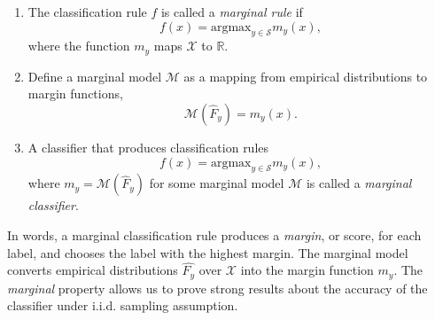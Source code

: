 \documentclass[12pt]{article}
\begin{document}
\begin{definition}
\begin{enumerate}
\item The classification rule $f$ is called a \emph{marginal rule} if 
\[
f(x) = \text{argmax}_{y \in \mathcal{S}} m_y(x),
\]
where the function $m_y$ maps $\mathcal{X}$ to $\mathbb{R}$. 
\item Define a marginal model $\mathcal{M}$ as a mapping from empirical distributions
to margin functions,
\[
\mathcal{M}(\hat{F}_y) = m_y(x).
\]
\item A classifier that produces classification rules
\[
f(x) = \text{argmax}_{y \in \mathcal{S}} m_y(x),
\]
where $m_y=\mathcal{M}(\hat{F}_y)$ for some marginal model $\mathcal{M}$
is called a \emph{marginal classifier}.
\end{enumerate}
\end{definition}
In words, a marginal classification rule produces a \emph{margin}, or
score, for each label, and chooses the label with the highest
margin. The marginal model converts empirical distributions
$\hat{F_y}$ over $\mathcal{X}$ into the margin function
$m_y$.  The \emph{marginal} property allows us to prove strong results
about the accuracy of the classifier under i.i.d. sampling assumption.

\end{document}
